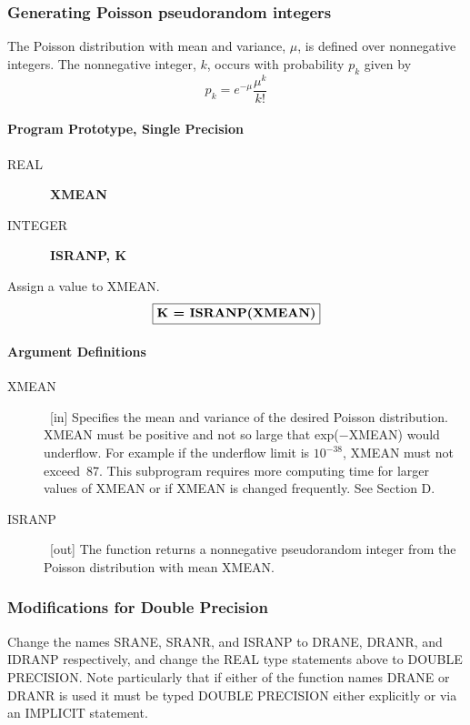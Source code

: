 \documentclass[twoside]{MATH77}
\begin{document}
\subsubsection{Generating Poisson pseudorandom integers}

The Poisson distribution with mean and variance, $\mu $, is defined over
nonnegative integers. The nonnegative integer, $k$, occurs with probability $%
p_k$ given by%
\begin{equation*}
p_k=e^{-\mu }\frac{\mu ^k}{k!}
\end{equation*}
\paragraph{Program Prototype, Single Precision}

\begin{description}
\item[REAL]  \ {\bf XMEAN}

\item[INTEGER]  \ {\bf ISRANP, K}
\end{description}

Assign a value to XMEAN.
$$
\fbox{{\bf K = ISRANP(XMEAN)}}
$$

\paragraph{Argument Definitions}

\begin{description}
\item[XMEAN]  \ [in] Specifies the mean and variance of the desired Poisson
distribution. XMEAN must be positive and not so large that exp($-$XMEAN)
would underflow. For example if the underflow limit is $10^{-38}$, XMEAN
must not exceed~87. This subprogram requires more computing time for larger
values of XMEAN or if XMEAN is changed frequently. See Section D.

\item[ISRANP]  \ [out] The function returns a nonnegative pseudorandom
integer from the Poisson distribution with mean XMEAN.
\end{description}

\subsubsection{Modifications for Double Precision}

Change the names SRANE, SRANR, and ISRANP to DRANE, DRANR, and IDRANP
respectively, and change the REAL type statements above to
DOUBLE PRECISION. Note particularly that if either of the function names
DRANE or DRANR is used it must be typed DOUBLE PRECISION either explicitly
or via an IMPLICIT statement.
\end{document}
